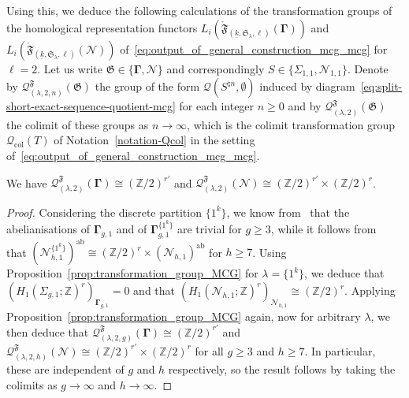 \documentclass[AHL,Unicode,published]{cedram}
\newcommand{\ab}{\mathrm{ab}}
\newcommand{\Int}{\mathring}
\newcommand{\col}{\mathrm{col}}
\newcommand{\MCGo}{\mathbf{\Gamma}}
\newcommand{\MCGno}{\boldsymbol{\mathcal{N}}}
\newcommand{\Sym}{\mathfrak{S}}
\newcommand{\fF}{\mathfrak{F}}
\newcommand{\fkG}{\mathfrak{G}}
\newcommand{\N}{\mathscr{N}}
\newcommand{\cQ}{\mathcal{Q}}
\newcommand{\bZ}{\mathbb{Z}}
\renewcommand{\geq}{\geqslant}
\begin{document}
Using this, we deduce the following calculations of the transformation groups of the homological representation functors $L_{i}(\Int{\fF}_{(\underline{k},\Sym_{\lambda},\ell)}(\MCGo))$ and $L_{i}(\Int{\fF}_{(\underline{k},\Sym_{\lambda},\ell)}(\MCGno))$ of~\eqref{eq:output_of_general_construction_mcg_mcg} for $\ell = 2$. Let us write $\fkG \in \{\MCGo,\MCGno\}$ and correspondingly $S\in\{\Sigma_{1,1},\N_{1,1}\}$. Denote by $\cQ^{\fF}_{(\lambda,2,n)}(\fkG)$ the group of the form $\cQ(S^{\natural n},\emptyset)$ induced by diagram~\eqref{eq:split-short-exact-sequence-quotient-mcg} for each integer $n \geq 0$ and by $\cQ^{\fF}_{(\lambda,2)}(\fkG)$ the colimit of these groups as $n\to\infty$, which is the colimit transformation group $\cQ_{\col}(T)$ of Notation~\ref{notation-Qcol} in the setting of~\eqref{eq:output_of_general_construction_mcg_mcg}.

\begin{coro}\label{coro:transformation_group_MCG}
We have $\cQ^{\fF}_{(\lambda,2)}(\MCGo)\cong(\bZ/2)^{r'}$ and $\cQ^{\fF}_{(\lambda,2)}(\MCGno)\cong(\bZ/2)^{r'}\times(\bZ/2)^{r}$.
\end{coro}

\begin{proof}
Considering the discrete partition $\boldsymbol{\{} 1^{k}\boldsymbol{\}}$, we know from~\cite[Th.~5.1]{Korkmaz_low} that the abelianisations of $\MCGo_{g,1}$ and of $\MCGo_{g,1}^{\boldsymbol{\{} 1^{k}\boldsymbol{\}}}$ are trivial for $g\geq 3$, while it follows from~\cite[Th.~6.21]{Stukow_Generating} that $(\MCGno_{h,1}^{\boldsymbol{\{} 1^{k}\boldsymbol{\}}})^{\ab}\cong (\bZ/2)^{r}\times (\MCGno_{h,1})^{\ab}$ for $h\geq 7$. Using Proposition~\ref{prop:transformation_group_MCG} for $\lambda = \boldsymbol{\{} 1^{k}\boldsymbol{\}}$, we deduce that $(H_{1}(\Sigma_{g,1};\bZ)^{r})_{\MCGo_{g,1}}=0$ and that $(H_{1}(\N_{h,1};\bZ)^{r})_{\MCGno_{h,1}}\cong (\bZ/2)^{r}$. Applying Proposition~\ref{prop:transformation_group_MCG} again, now for arbitrary $\lambda$, we then deduce that $\cQ^{\fF}_{(\lambda,2,g)}(\MCGo)\cong(\bZ/2)^{r'}$ and $\cQ^{\fF}_{(\lambda,2,h)}(\MCGno)\cong(\bZ/2)^{r'}\times(\bZ/2)^{r}$ for all $g \geq 3$ and $h \geq 7$. In particular, these are independent of $g$ and $h$ respectively, so the result follows by taking the colimits as $g\to\infty$ and $h\to\infty$.
\end{proof}



\end{document}
